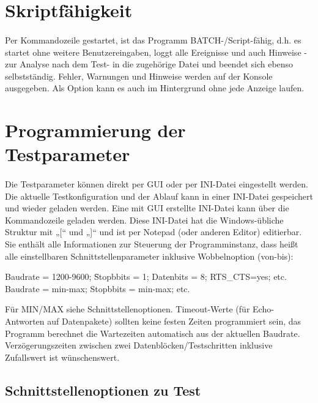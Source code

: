 \section{Skriptfähigkeit}
\paragraph{}
Per Kommandozeile gestartet, ist das Programm BATCH-/Script-fähig, d.h. es startet ohne weitere Benutzereingaben, loggt alle Ereignisse und auch Hinweise -zur Analyse nach dem Test- in die zugehörige Datei und beendet sich ebenso selbstständig. Fehler, Warnungen und Hinweise werden auf der Konsole ausgegeben. Als Option kann es auch im Hintergrund ohne jede Anzeige laufen.


\section{Programmierung der Testparameter}
\paragraph{}
Die Testparameter können direkt per GUI oder per INI-Datei eingestellt werden. Die aktuelle Testkonfiguration und der Ablauf kann in einer INI-Datei gespeichert und wieder geladen werden. Eine mit GUI erstellte INI-Datei kann über die Kommandozeile geladen werden. Diese INI-Datei hat die Windows-übliche Struktur mit „[“ und „]“ und ist per Notepad (oder anderen Editor) editierbar.
\\
Sie enthält alle Informationen zur Steuerung der Programminstanz, dass heißt alle einstellbaren Schnittstellenparameter inklusive Wobbelnoption (von-bis):
\begin{tabbing}
\hspace*{10mm}Baudrate = 1200-9600; \=Stopbbits = 1; Datenbits = 8; RTS\_CTS=yes; etc.
\\
\hspace*{10mm}Baudrate = min-max; \>Stopbbits = min-max; etc.
\end{tabbing}

Für MIN/MAX siehe Schnittstellenoptionen. Timeout-Werte (für Echo-Antworten auf Datenpakete) sollten keine festen Zeiten programmiert sein, das Programm  berechnet die Wartezeiten automatisch aus der aktuellen Baudrate. Verzögerungszeiten zwischen zwei Datenblöcken/Testschritten inklusive Zufallswert ist wünschenswert.


\subsection{Schnittstellenoptionen zu Test}
